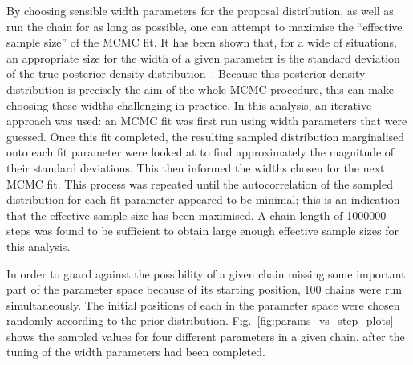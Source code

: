 By choosing sensible width parameters for the proposal distribution, as well as run the chain for as long as possible, one can attempt to maximise the ``effective sample size'' of the MCMC fit. It has been shown that, for a wide of situations, an appropriate size for the width of a given parameter is the standard deviation of the true posterior density distribution~\cite{}. %
Because this posterior density distribution is precisely the aim of the whole MCMC procedure, this can make choosing these widths challenging in practice. In this analysis, an iterative approach was used: an MCMC fit was first run using width parameters that were guessed. Once this fit completed, the resulting sampled distribution marginalised onto each fit parameter were looked at to find approximately the magnitude of their standard deviations. This then informed the widths chosen for the next MCMC fit. This process was repeated until the autocorrelation of the sampled distribution for each fit parameter appeared to be minimal; this is an indication that the effective sample size has been maximised. A chain length of \num{1000000} steps was found to be sufficient to obtain large enough effective sample sizes for this analysis.

In order to guard against the possibility of a given chain missing some important part of the parameter space because of its starting position, 100 chains were run simultaneously. The initial positions of each in the parameter space were chosen randomly according to the prior distribution. Fig.~\ref{fig:params_vs_step_plots} shows the sampled values for four different parameters in a given chain, after the tuning of the width parameters had been completed.

